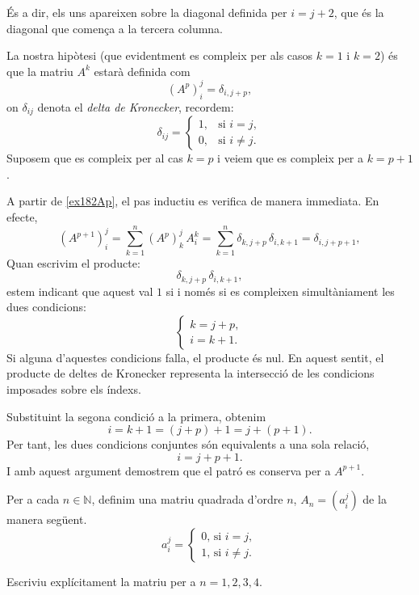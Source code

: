 \begin{solution}
    És a dir, els uns apareixen sobre la diagonal definida per $i=j+2$, que és la diagonal que comença a la tercera columna.

    La nostra hipòtesi (que evidentment es compleix per als casos $k=1$ i $k=2$) és que la matriu $A^k$ estarà definida com 
    \begin{equation}
        \label{ex182Ap}
        (A^p)^j_i = \delta_{i,j+p},
    \end{equation}
    on $\delta_{ij}$ denota el \emph{delta de Kronecker}, recordem:
    \[
    \delta_{ij} =
    \begin{cases}
    1, & \text{si } i = j,\\
    0, & \text{si } i \neq j.
    \end{cases}
    \]
    Suposem que es compleix per al cas $k=p$ i veiem que es compleix per a $k=p+1$.
    
    A partir de \eqref{ex182Ap}, el pas inductiu es verifica de manera immediata. En efecte,
    \[
    (A^{p+1})^j_i
    = \sum_{k=1}^n (A^p)^j_k\,A^k_i
    = \sum_{k=1}^n \delta_{k,j+p}\,\delta_{i,k+1}
    = \delta_{i,j+p+1},
    \]
    Quan escrivim el producte:
    \[
    \delta_{k,j+p}\,\delta_{i,k+1},
    \]
    estem indicant que aquest val $1$ si i només si es compleixen simultàniament les dues condicions:
    \[
    \begin{cases}
    k = j+ p,\\
    i= k + 1.
    \end{cases}
    \]
    Si alguna d’aquestes condicions falla, el producte és nul. En aquest sentit, el producte de deltes de Kronecker representa la intersecció de les condicions imposades sobre els índexs.

    Substituint la segona condició a la primera, obtenim
    \[
    i = k + 1 = (j+p) + 1 = j + (p+1).
    \]
    Per tant, les dues condicions conjuntes són equivalents a una sola relació,
    \[
    i = j + p + 1.
    \]
    I amb aquest argument demostrem que el patró es conserva per a $A^{p+1}$.


\end{solution}

\begin{exercise}[1.8.3]
Per a cada $n\in\mathbb{N}$, definim una matriu quadrada d'ordre $n$, $A_n=(a^j_i)$ de la manera següent.
\begin{equation}
    a^j_i = \left\{
    \begin{aligned}
        0\text{, si } i=j,\\
        1\text{, si } i \neq j.
    \end{aligned}\right.
\end{equation}

Escriviu explícitament la matriu per a $n=1,2,3,4$.
\end{exercise}

